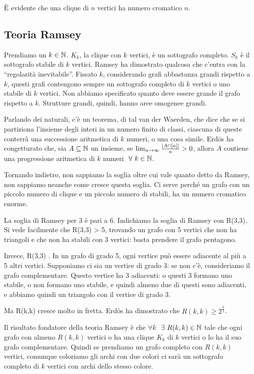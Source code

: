 \`E evidente che una clique di $n$ vertici ha numero cromatico $n$.

\subsection{Teoria Ramsey}

Prendiamo un $k \in \mathbb{N}$.
$K_k$, la clique con $k$ vertici, \`e un sottografo completo.
$S_k$ \`e il sottografo stabile di $k$ vertici.
Ramsey ha dimostrato qualcosa che c'entra con la ``regolarit\`a inevitabile''.
Fissato $k$, considerando grafi abbastanza grandi rispetto a $k$, questi grafi contengono sempre un sottografo completo di $k$ vertici o uno stabile di $k$ vertici.
Non abbiamo specificato quanto deve essere grande il grafo rispetto a $k$.
Strutture grandi, quindi, hanno aree omogenee grandi.

Parlando dei naturali, c'\`e un teorema, di tal van der Waerden, che dice che se si partiziona l'insieme degli interi in un numero finito di classi, ciascuna di queste conterr\`a una successione aritmetica di $k$ numeri, o una cosa simile.
Erd\"os ha congetturato che, sia $A \subseteq \mathbb{N}$ un insieme, se $\lim_{n \to \infty} \frac{\left\lvert{A \cap [n]}\right\rvert}{n} > 0$, allora $A$ contiene una progressione aritmetica di $k$ numeri $\forall k \in \naturals$.

Tornando indietro, non sappiamo la soglia oltre cui vale quanto detto da Ramsey, non sappiamo neanche come cresce questa soglia.
Ci serve perch\'e un grafo con un piccolo numero di clique e un piccolo numero di stabili, ha un numero cromatico enorme.

La soglia di Ramsey per 3 \`e pari a 6.
Indichiamo la soglia di Ramsey con R(3,3).
Si vede facilmente che R(3,3) > 5, trovando un grafo con 5 vertici che non ha triangoli e che non ha stabili con 3 vertici: basta prendere il grafo pentagono.

Invece, R(3,3) .
In un grafo di grado 5, ogni vertice pu\`o essere adiacente al pi\`u a 5 altri vertici.
Supponiamo ci sia un vertice di grado 3: se non c'\`e, consideriamo il grafo complementare.
Questo vertice ha 3 adiacenti: o questi 3 formano uno stabile, o non formano uno stabile, e quindi almeno due di questi sono adiacenti, e abbiamo quindi un triangolo con il vertice di grado 3.

Ma R(k,k) cresce molto in fretta.
Erd\"os ha dimostrato che $R(k,k) \ge 2^{\frac{k}{2}}$.

Il risultato fondatore della teoria Ramsey \`e che $\forall k$ $\exists R(k,k) \in \naturals$ tale che ogni grafo con almeno $R(k,k)$ vertici o ha una clique $K_k$ di $k$ vertici o lo ha il suo grafo complementare.
Quindi se prendiamo un grafo completo con $R(k,k)$ vertici, comunque coloriamo gli archi con due colori ci sar\`a un sottografo completo di $k$ vertici con archi dello stesso colore.

